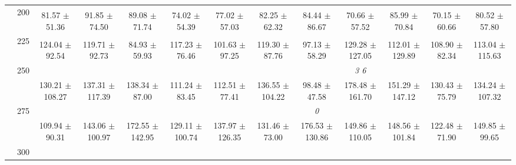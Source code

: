 \begin{table}[h]
{\begin{tabular}{
        ccccccccccccc}
 & \multirow{2}{*}{200}& & & & & & & & & & &  \\ 
 & & 81.57 $\pm$ 51.36& 91.85 $\pm$ 74.50& 89.08 $\pm$ 71.74& 74.02 $\pm$ 54.39& 77.02 $\pm$ 57.03& 82.25 $\pm$ 62.32& 84.44 $\pm$ 86.67& 70.66 $\pm$ 57.52& 85.99 $\pm$ 70.84& 70.15 $\pm$ 60.66& 80.52 $\pm$ 57.80 \\ 
 & \multirow{2}{*}{225}& \cellcolor[HTML]{EFEFEF} & \cellcolor[HTML]{EFEFEF} & \cellcolor[HTML]{EFEFEF} & \cellcolor[HTML]{EFEFEF} & \cellcolor[HTML]{EFEFEF} & \cellcolor[HTML]{EFEFEF} & \cellcolor[HTML]{EFEFEF} & \cellcolor[HTML]{EFEFEF} & \cellcolor[HTML]{EFEFEF} & \cellcolor[HTML]{EFEFEF} & \cellcolor[HTML]{EFEFEF}  \\ 
 & & \cellcolor[HTML]{EFEFEF} 124.04 $\pm$ 92.54& \cellcolor[HTML]{EFEFEF} 119.71 $\pm$ 92.73& \cellcolor[HTML]{EFEFEF} 84.93 $\pm$ 59.93& \cellcolor[HTML]{EFEFEF} 117.23 $\pm$ 76.46& \cellcolor[HTML]{EFEFEF} 101.63 $\pm$ 97.25& \cellcolor[HTML]{EFEFEF} 119.30 $\pm$ 87.76& \cellcolor[HTML]{EFEFEF} 97.13 $\pm$ 58.29& \cellcolor[HTML]{EFEFEF} 129.28 $\pm$ 127.05& \cellcolor[HTML]{EFEFEF} 112.01 $\pm$ 129.89& \cellcolor[HTML]{EFEFEF} 108.90 $\pm$ 82.34& \cellcolor[HTML]{EFEFEF} 113.04 $\pm$ 115.63 \\ 
 & \multirow{2}{*}{250}& & & & & & & & \textit{ 3 6 }& & &  \\ 
 & & 130.21 $\pm$ 108.27& 137.31 $\pm$ 117.39& 138.34 $\pm$ 87.00& 111.24 $\pm$ 83.45& 112.51 $\pm$ 77.41& 136.55 $\pm$ 104.22& 98.48 $\pm$ 47.58& 178.48 $\pm$ 161.70& 151.29 $\pm$ 147.12& 130.43 $\pm$ 75.79& 134.24 $\pm$ 107.32 \\ 
 & \multirow{2}{*}{275}& \cellcolor[HTML]{EFEFEF} & \cellcolor[HTML]{EFEFEF} & \cellcolor[HTML]{EFEFEF} & \cellcolor[HTML]{EFEFEF} & \cellcolor[HTML]{EFEFEF} & \cellcolor[HTML]{EFEFEF} & \cellcolor[HTML]{EFEFEF} \textit{ 0 }& \cellcolor[HTML]{EFEFEF} & \cellcolor[HTML]{EFEFEF} & \cellcolor[HTML]{EFEFEF} & \cellcolor[HTML]{EFEFEF}  \\ 
 & & \cellcolor[HTML]{EFEFEF} 109.94 $\pm$ 90.31& \cellcolor[HTML]{EFEFEF} 143.06 $\pm$ 100.97& \cellcolor[HTML]{EFEFEF} 172.55 $\pm$ 142.95& \cellcolor[HTML]{EFEFEF} 129.11 $\pm$ 100.74& \cellcolor[HTML]{EFEFEF} 137.97 $\pm$ 126.35& \cellcolor[HTML]{EFEFEF} 131.46 $\pm$ 73.00& \cellcolor[HTML]{EFEFEF} 176.53 $\pm$ 130.86& \cellcolor[HTML]{EFEFEF} 149.86 $\pm$ 110.05& \cellcolor[HTML]{EFEFEF} 148.56 $\pm$ 101.84& \cellcolor[HTML]{EFEFEF} 122.48 $\pm$ 71.90& \cellcolor[HTML]{EFEFEF} 149.85 $\pm$ 99.65 \\ 
 & \multirow{2}{*}{300}& & & & & & & & & & &  \\ 

\end{tabular}}
\end{table}
